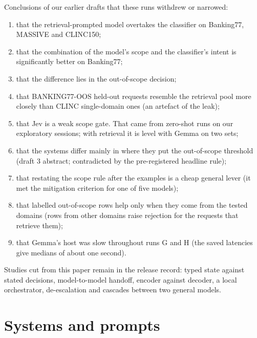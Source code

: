 \documentclass[11pt]{article}
\begin{document}
Conclusions of our earlier drafts that these runs withdrew or narrowed:
\begin{enumerate}
  \item that the retrieval-prompted model overtakes the classifier on Banking77, MASSIVE and CLINC150;
  \item that the combination of the model's scope and the classifier's intent is significantly better on Banking77;
  \item that the difference lies in the out-of-scope decision;
  \item that BANKING77-OOS held-out requests resemble the retrieval pool more closely than CLINC single-domain ones (an artefact of the leak);
  \item that Jev is a weak scope gate. That came from zero-shot runs on our exploratory sessions; with retrieval it is level with Gemma on two sets;
  \item that the systems differ mainly in where they put the out-of-scope threshold (draft 3 abstract; contradicted by the pre-registered headline rule);
  \item that restating the scope rule after the examples is a cheap general lever (it met the mitigation criterion for one of five models);
  \item that labelled out-of-scope rows help only when they come from the tested domains (rows from other domains raise rejection for the requests that retrieve them);
  \item that Gemma's host was slow throughout runs G and H (the saved latencies give medians of about one second).
\end{enumerate}
Studies cut from this paper remain in the release record: typed state against stated decisions, model-to-model handoff, encoder against decoder, a local orchestrator, de-escalation and cascades between two general models.

\section{Systems and prompts}
\label{app:systems}
\end{document}

